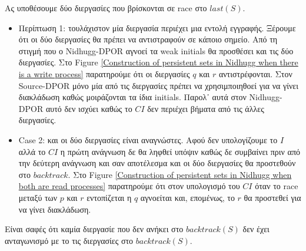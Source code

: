 Ας υποθέσουμε δύο διεργασίες που βρίσκονται σε race στο $last(S)$.
\begin{itemize}

\item Περίπτωση 1: τουλάχιστον μία διεργασία περιέχει μια εντολή εγγραφής. Ξέρουμε ότι οι δύο διεργασίες θα πρέπει να αντιστραφούν σε κάποιο σημείο.
Από τη στιγμή που ο Nidhugg-DPOR αγνοεί τα weak initials θα προσθέσει και τις δύο διεργασίες. Στο Figure \ref{Construction of persistent
sets in Nidhugg when there is a write process} παρατηρούμε ότι οι διεργασίες $q$ και $r$ αντιστρέφονται. Στον Source-DPOR 
μόνο μία από τις διεργασίες πρέπει να χρησιμποιηθοεί για να γίνει διακλάδωση καθώς μοιράζονται τα ίδια initials. 
Παρολ᾽ αυτά στον Nidhugg-DPOR αυτό δεν ισχύει καθώς το $CI$ δεν περιέχει βήματα από τις άλλες διεργασίες.


\item Case 2: και οι δύο διεργασίες είναι αναγνώστες.
Αφού δεν υπολογίζουμε το $I$ αλλά το $CI$ η πρώτη ανάγνωση δε θα ληφθεί υπόψιν καθώς δε συμβαίνει πριν από την δεύτερη ανάγνωση και σαν αποτέλεσμα και οι δύο διεργασίες
θα προστεθούν στο $backtrack$. Στο Figure \ref{Construction of persistent sets in Nidhugg when both are read processes} παρατηρούμε ότι στον υπολογισμό του $CI$ 
όταν το race μεταξύ των $p$ και $r$ εντοπίζεται η $q$ αγνοείται και, επομένως, το $r$ θα προστεθεί για να γίνει διακλάδωση.


\end{itemize}

Είναι σαφές ότι καμία διεργασίε που δεν ανήκει στο $backtrack(S)$ δεν έχει ανταγωνισμό με το τις διεργασίες στο $backtrack(S)$. 
